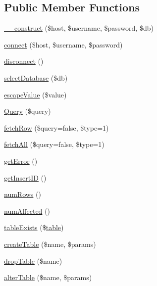 \subsection*{Public Member Functions}
\begin{DoxyCompactItemize}
\item 
\hyperlink{class_my_s_q_li_database_a81fcddb424f13e0862ee3f7e1ea57ce9}{\_\-\_\-construct} (\$host, \$username, \$password, \$db)
\item 
\hyperlink{class_my_s_q_li_database_a4c4f3316747e665b9e02f6ddcba4117c}{connect} (\$host, \$username, \$password)
\item 
\hyperlink{class_my_s_q_li_database_abe175fcf658475bc56e9d6fa02bc88ec}{disconnect} ()
\item 
\hyperlink{class_my_s_q_li_database_ab624b0b234f9db9dbc6dc4180f566b1f}{selectDatabase} (\$db)
\item 
\hyperlink{class_my_s_q_li_database_a039ae2e8f2bf579fd75d9df8df87eee3}{escapeValue} (\$value)
\item 
\hyperlink{class_my_s_q_li_database_aebc962126fd37fd3478c4689156d5f83}{Query} (\$query)
\item 
\hyperlink{class_my_s_q_li_database_acdee1c4e55c3792b3dbfeedfac35912f}{fetchRow} (\$query=false, \$type=1)
\item 
\hyperlink{class_my_s_q_li_database_a1750ab2493620de034b80a77577f3e8b}{fetchAll} (\$query=false, \$type=1)
\item 
\hyperlink{class_my_s_q_li_database_a24ada5decce3d1b79cd82f5a90ccf404}{getError} ()
\item 
\hyperlink{class_my_s_q_li_database_ac73f1d8cddbdfc35ca442189378a073c}{getInsertID} ()
\item 
\hyperlink{class_my_s_q_li_database_af37433a300db1f607ee789d22828a0a0}{numRows} ()
\item 
\hyperlink{class_my_s_q_li_database_acac8dfe61e7840f9a1e672ebede0be21}{numAffected} ()
\item 
\hyperlink{class_my_s_q_li_database_ae7cdaa744d52a1eb0103e377023ca528}{tableExists} (\$\hyperlink{classtable}{table})
\item 
\hyperlink{class_my_s_q_li_database_a4b06dfe3bf7dd552f828a80fece817d8}{createTable} (\$name, \$params)
\item 
\hyperlink{class_my_s_q_li_database_a3471d37afdd3d76f5379dfe7364db0b6}{dropTable} (\$name)
\item 
\hyperlink{class_my_s_q_li_database_aa8cf3e2be109e548bed6980622fffb41}{alterTable} (\$name, \$params)
\end{DoxyCompactItemize}
